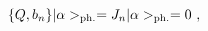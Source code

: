 \begin{equation}
\{Q, b_n\}  | \alpha >_{{\rm ph.}} = J_{n}  | \alpha >_{{\rm ph.}} = 0~,  \label{eq:bellibir} 
\end{equation}

